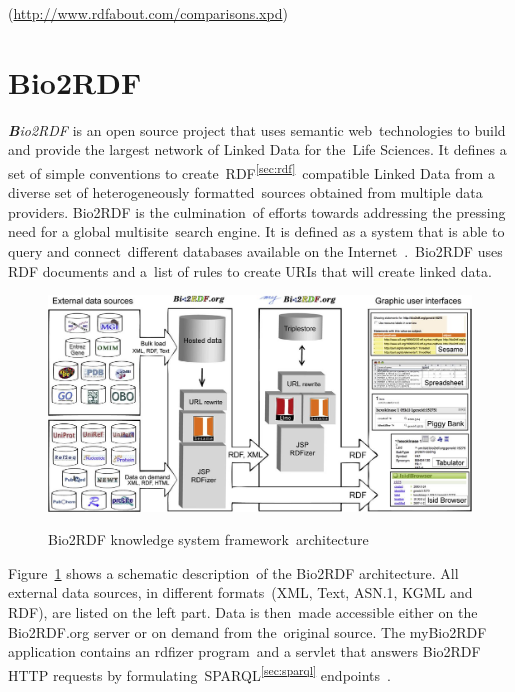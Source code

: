 \documentclass[DIV=calc, paper=a4, fontsize=12pt, onecolumn]{scrartcl}	 %
\newcommand{\initial}[1]{ %
\lettrine[lines=3,lhang=0.3,nindent=0em,slope=0em]{
\color{DarkBlue}
{\textbf{\textit{#1}}}}{}}
\begin{document}
 (\url{http://www.rdfabout.com/comparisons.xpd})\\

  \section{Bio2RDF}
  \label{sec:bio2rdf}
  
  \initial{B}\textit{io2RDF} is an open source project that uses semantic web\
  technologies to build and provide the largest network of Linked Data for the\
  Life Sciences. It defines a set of simple conventions to create\
  RDF\textsuperscript{\ref{sec:rdf}}\
  compatible Linked Data from a diverse set of heterogeneously formatted\
  sources obtained from multiple data providers. Bio2RDF is the culmination\
  of efforts towards addressing the pressing need for a global multisite\
  search engine. It is defined as a system that is able to query and connect\
 different databases available on the Internet~\cite{belleau_bio2rdf:_2008}.\
  Bio2RDF uses RDF documents and a\
  list of rules to create URIs that will create linked data.\\
  
  \begin{figure}[ht!]
    \centering
    \includegraphics[scale=0.30]{bio2rdf_architecture.jpg}
    \caption{Bio2RDF knowledge system framework\
    architecture}\cite[Fig.~1]{belleau_bio2rdf:_2008}
    \label{fig:bio2rdf_architecture}
  \end{figure}  

  \noindent Figure~\ref{fig:bio2rdf_architecture} shows a schematic description\
  of the Bio2RDF architecture. All external data sources, in different formats\
  (XML, Text, ASN.1, KGML and RDF), are listed on the left part. Data is then\
  made accessible either on the Bio2RDF.org server or on demand from the\
  original source. The myBio2RDF application contains an rdfizer program\
  and a servlet that answers Bio2RDF HTTP requests by formulating\
  SPARQL\textsuperscript{\ref{sec:sparql}} endpoints~\citep{callahan_bio2rdf_2013}.\\
  
\end{document}

